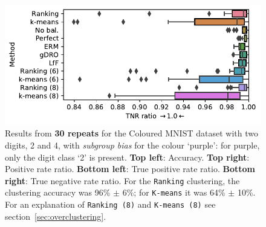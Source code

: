 \begin{figure}[htp]
  \includegraphics[width=\columnwidth]{figures/cmnist_2v4_partial_overcluster_tnrr.pdf}
  \caption{
    Results from \textbf{30 repeats} for the Coloured MNIST dataset with two digits, 2 and 4, with \emph{subgroup bias} for the colour `{\color{purple}purple}': for {\color{purple}purple}, only the digit class `2' is present.
    \textbf{Top left}: Accuracy.
    \textbf{Top right}: Positive rate ratio.
    \textbf{Bottom left}: True positive rate ratio.
    \textbf{Bottom right}: True negative rate ratio.
    For the \texttt{Ranking} clustering, the clustering accuracy was 96\% $\pm$ 6\%;
    for \texttt{K-means} it was 64\% $\pm$ 10\%.
    For an explanation of \texttt{Ranking (8)} and \texttt{K-means (8)} see section~\ref{sec:overclustering}.
  }%
  \label{fig:cmnist-2v4-partial-add}
\end{figure}

